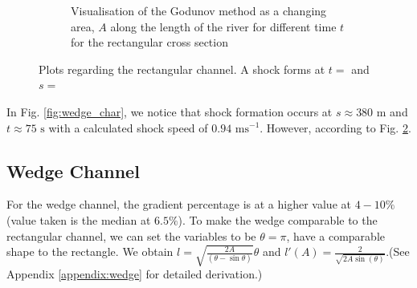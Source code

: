 \documentclass[12pt]{article}
\begin{document}
\begin{figure}[H]
\begin{subfigure}[b]{0.49\textwidth}
        \caption{Visualisation of the Godunov method as a changing area, $A$ along the length of the river for different time $t$ for the rectangular cross section}
        \label{fig:rect_godunov}
    \end{subfigure}
    \caption{Plots regarding the rectangular channel. A shock forms at $t = $ and $s = $}
\end{figure}

In Fig. \ref{fig:wedge_char}, we notice that shock formation occurs at $s\approx 380\text{ m}$ and $t\approx 75\text{ s}$ with a calculated shock speed of $ 0.94\text{ ms}^{-1}$. However, according to Fig. \ref{fig:rect_godunov}.

\subsection{Wedge Channel}
For the wedge channel, the gradient percentage is at a higher value at $4-10\%$ (value taken is the median at $6.5\%$). To make the wedge comparable to the rectangular channel, we can set the variables to be $\theta = \pi$, have a comparable shape to the rectangle. We obtain $l =\sqrt{\frac{2A}{\left(\theta - \sin\theta\right)}}\theta$ and $l'(A) =\frac{2}{\sqrt{2A\sin(\theta)}}$.(See Appendix \ref{appendix:wedge} for detailed derivation.)
\end{document}
